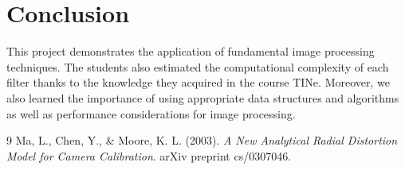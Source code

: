 \documentclass[12pt,a4paper]{article}
\begin{document}
\section{Conclusion}
This project demonstrates the application of fundamental image processing techniques. The students also estimated the computational complexity of each filter thanks to the knowledge they acquired in the course TINe. Moreover, we  also learned the importance of using appropriate data structures and algorithms as well as performance considerations for image processing. 
\begin{thebibliography}{9}
Ma, L., Chen, Y., \& Moore, K. L. (2003).
\textit{A New Analytical Radial Distortion Model for Camera Calibration}.
arXiv preprint cs/0307046.
\end{thebibliography}
\end{document}
